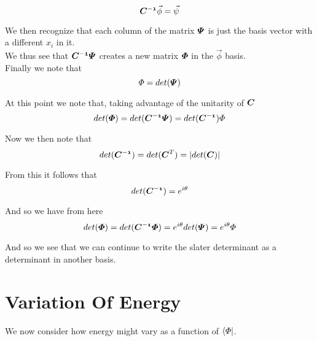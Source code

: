 \documentclass[11pt]{article} %
\begin{document}
\begin{equation}
\matrixsym{C^{-1}}\vec{\phi}=\vec{\psi}
\end{equation}

We then recognize that each column of the matrix $\matrixsym{\Psi}$ is just the basis vector with a different $x_i$ in it.\\

We thus see that $\matrixsym{C^{-1}}\matrixsym{\Psi}$ creates a new matrix $\matrixsym{\Phi}$ in the $\vec{\phi}$ basis.\\

Finally we note that\\

\begin{equation} \Phi=det(\matrixsym{\Psi}) \end{equation}

At this point we note that, taking advantage of the unitarity of $\matrixsym{C}$\\

\begin{equation} 
det(\matrixsym{\Phi})=det(\matrixsym{C^{-1}}\matrixsym{\Psi})=det(\matrixsym{C^{-1}})\Phi
\end{equation}

Now we then note that \\
\begin{equation}
det(\matrixsym{C^{-1}})=det({\matrixsym{C}^{T}})=|det({\matrixsym{C}})|
\end{equation}

From this it follows that 
\begin{equation}
det(\matrixsym{C^{-1}})=e^{i\theta}
\end{equation}

And so we have from here\\

\begin{equation}
det(\matrixsym{\Phi})=det(\matrixsym{C^{-1}}\matrixsym{\Phi})=e^{i\theta}det(\matrixsym{\Psi})=e^{i\theta}\Phi
\end{equation}

And so we see that we can continue to write the slater determinant as a determinant in another basis.

\section{Variation Of Energy}

We now consider how energy might vary as a function of $\bra{\Phi}$.\\
\end{document}
